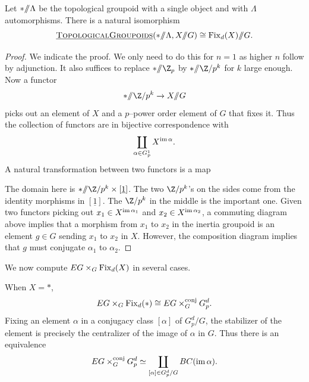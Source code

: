 \begin{lemma} \label{inertialemma}
Let \(\ast /\!\!/ \Lambda\) be the topological groupoid with a single object and with \(\Lambda\) automorphisms.
There is a natural isomorphism 
\[
\operatorname{\underline{\smash{\normalfont\textsc{TopologicalGroupoids}}}}(\ast /\!\!/ \Lambda, X /\!\!/ G) \cong \operatorname{Fix}_d(X) /\!\!/ G.
\]
\end{lemma} 
\begin{proof}
We indicate the proof.
We only need to do this for \(n=1\) as higher \(n\) follow by adjunction.
It also suffices to replace \(\ast \mmod \Z_p\) by \(\ast \mmod \Z/p^k\) for \(k\) large enough.
Now a functor
\[
\ast \mmod \Z/p^k \xrightarrow{} X \mmod G
\]
picks out an element of \(X\) and a \(p\)--power order element of \(G\) that fixes it.
Thus the collection of functors are in bijective correspondence with
\[
\coprod_{\alpha \in G^{1}_{p}} X^{\operatorname{im} \alpha}.
\]
A natural transformation between two functors is a map
\begin{center}
\end{center}
The domain here is \(\ast \mmod \Z/p^k \times [\underline{1}]\).
The two \(\Z/p^k\)'s on the sides come from the identity morphisms in \([\underline{1}]\).
The \(\Z/p^k\) in the middle is the important one.
Given two functors picking out \(x_1 \in X^{\operatorname{im} \alpha_1}\) and \(x_2 \in X^{\operatorname{im} \alpha_2}\), a commuting diagram above implies that a morphism from \(x_1\) to \(x_2\) in the inertia groupoid is an element \(g \in G\) sending \(x_1\) to \(x_2\) in \(X\).
However, the composition diagram implies that \(g\) must conjugate \(\alpha_1\) to \(\alpha_2\).
\end{proof}

We now compute \(EG \times_G \operatorname{Fix}_d(X)\) in several cases.

\begin{example} \label{xapoint2}
When \(X = \ast\),
\[
EG \times_G \operatorname{Fix}_d(\ast) \cong EG \times_{G}^{\text{conj}} G_{p}^{d}.
\]
Fixing an element \(\alpha\) in a conjugacy class \([\alpha]\) of \(G_{p}^{d}/G\), the stabilizer of the element is precisely the centralizer of the image of \(\alpha\) in \(G\).
Thus there is an equivalence
\[
EG \times_{G}^{\text{conj}} G_{p}^{d} \simeq \coprod_{[\alpha] \in G_{p}^{d}/G} BC(\operatorname{im} \alpha).
\]
\end{example}

